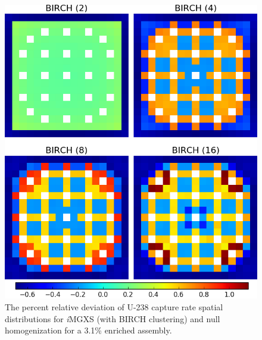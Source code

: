 \begin{figure}[h!]
\centering
\includegraphics[width=0.9\linewidth]{figures/results/compare/assm-31/compare-capt}
\vspace{2mm}
\caption[U-238 capture rate \textit{i}MGXS-to-null relative deviations]{The percent relative deviation of U-238 capture rate spatial distributions for \textit{i}\ac{MGXS} (with BIRCH clustering) and null homogenization for a 3.1\% enriched assembly.}
\label{fig:chap11-assm-3.1-capt-rates-comp}
\end{figure}

\clearpage

